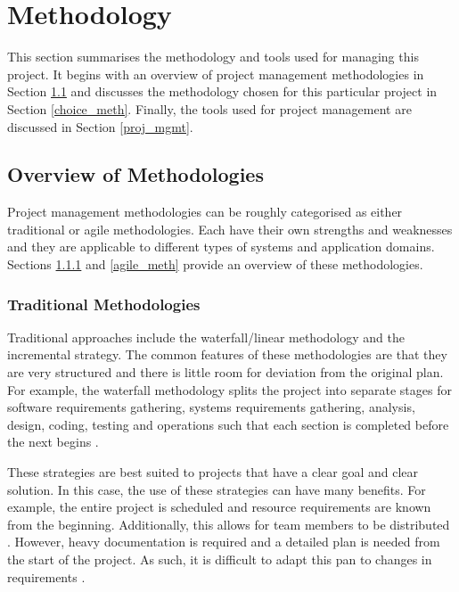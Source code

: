 \documentclass{UoYCSproject}
\begin{document}
\chapter{Methodology} \label{meth_chapt}
This section summarises the methodology and tools used for managing this project. It begins with an overview of project management methodologies in Section \ref{overview_meth} and discusses the methodology chosen for this particular project in Section \ref{choice_meth}. Finally, the tools used for project management are discussed in Section \ref{proj_mgmt}.

\section{Overview of Methodologies} \label{overview_meth}
Project management methodologies can be roughly categorised as either traditional or agile methodologies. Each have their own strengths and weaknesses and they are applicable to different types of systems and application domains. Sections \ref{trad_meth} and \ref{agile_meth} provide an overview of these methodologies.
\subsection{Traditional Methodologies} \label{trad_meth}
Traditional approaches include the waterfall/linear methodology and the incremental strategy. The common features of these methodologies are that they are very structured and there is little room for deviation from the original plan. For example, the waterfall methodology splits the project into separate stages for software requirements gathering, systems requirements gathering, analysis, design, coding, testing and operations such that each section is completed before the next begins \parencite{royce1987managing}.

These strategies are best suited to projects that have a clear goal and clear solution. In this case, the use of these strategies can have many benefits. For example, the entire project is scheduled and resource requirements are known from the beginning. Additionally, this allows for team members to be distributed \parencite{fernandez2008agile}. However, heavy documentation is required and a detailed plan is needed from the start of the project. As such, it is difficult to adapt this pan to changes in requirements \parencite{fernandez2008agile}.
\end{document}
